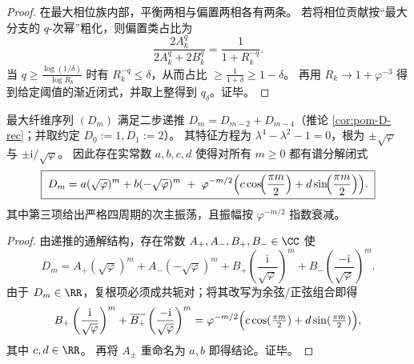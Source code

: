 \begin{proof}
在最大相位族内部，平衡两相与偏置两相各有两条。
若将相位贡献按“最大分支的 \(q\)-次幂”粗化，则偏置类占比为
\[
\frac{2A_k^q}{2A_k^q+2B_k^q}=\frac{1}{1+R_k^{-q}}.
\]
当 \(q\ge \frac{\log(1/\delta)}{\log R_k}\) 时有 \(R_k^{-q}\le \delta\)，从而占比 \(\ge \frac{1}{1+\delta}\ge 1-\delta\)。
再用 \(R_k\to 1+\varphi^{-3}\) 得到给定阈值的渐近闭式，并取上整得到 \(q_\delta\)。证毕。
\end{proof}

\begin{proposition}\label{prop:pom-D-spectral-decomposition-fourperiod}
最大纤维序列 \((D_m)\) 满足二步递推 \(D_m=D_{m-2}+D_{m-4}\)（推论 \ref{cor:pom-D-rec}；并取约定 \(D_0:=1,D_1:=2\)）。
其特征方程为 \(\lambda^4-\lambda^2-1=0\)，根为 \(\pm\sqrt{\varphi}\) 与 \(\pm \mathrm{i}/\sqrt{\varphi}\)。
因此存在实常数 \(a,b,c,d\) 使得对所有 \(m\ge 0\) 都有谱分解闭式
\[
\boxed{\;
D_m=a(\sqrt{\varphi})^{m}+b(-\sqrt{\varphi})^{m}
\;+\;\varphi^{-m/2}\Bigl(c\cos\!\Bigl(\frac{\pi m}{2}\Bigr)+d\sin\!\Bigl(\frac{\pi m}{2}\Bigr)\Bigr).\;}
\]
其中第三项给出严格四周期的次主振荡，且振幅按 \(\varphi^{-m/2}\) 指数衰减。
\end{proposition}

\begin{proof}
由递推的通解结构，存在常数 \(A_+,A_-,B_+,B_-\in\CC\) 使
\[
D_m=A_+(\sqrt{\varphi})^m+A_-(-\sqrt{\varphi})^m
+B_+\left(\frac{\mathrm{i}}{\sqrt{\varphi}}\right)^m
+B_-\left(\frac{-\mathrm{i}}{\sqrt{\varphi}}\right)^m.
\]
由于 \(D_m\in\RR\)，复根项必须成共轭对；将其改写为余弦/正弦组合即得
\[
B_+\left(\frac{\mathrm{i}}{\sqrt{\varphi}}\right)^m
+\overline{B_+}\left(\frac{-\mathrm{i}}{\sqrt{\varphi}}\right)^m
=\varphi^{-m/2}\Bigl(c\cos(\tfrac{\pi m}{2})+d\sin(\tfrac{\pi m}{2})\Bigr),
\]
其中 \(c,d\in\RR\)。
再将 \(A_\pm\) 重命名为 \(a,b\) 即得结论。证毕。
\end{proof}

\endinput

